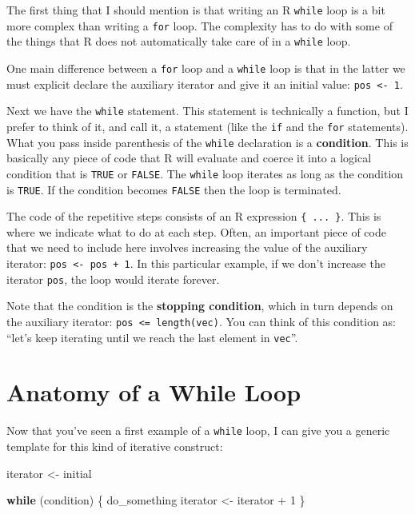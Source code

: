 \documentclass[
]{book}
\newenvironment{Shaded}{\begin{snugshade}}{\end{snugshade}}
\newcommand{\ControlFlowTok}[1]{\textcolor[rgb]{0.13,0.29,0.53}{\textbf{#1}}}
\newcommand{\DecValTok}[1]{\textcolor[rgb]{0.00,0.00,0.81}{#1}}
\newcommand{\NormalTok}[1]{#1}
\newcommand{\OtherTok}[1]{\textcolor[rgb]{0.56,0.35,0.01}{#1}}
\newcommand{\SpecialCharTok}[1]{\textcolor[rgb]{0.00,0.00,0.00}{#1}}
\begin{document}
The first thing that I should mention is that writing an R \texttt{while} loop is a
bit more complex than writing a \texttt{for} loop. The complexity has to do with some
of the things that R does not automatically take care of in a \texttt{while} loop.

One main difference between a \texttt{for} loop and a \texttt{while} loop is that in the
latter we must explicit declare the auxiliary iterator and give it an initial
value: \texttt{pos\ \textless{}-\ 1}.

Next we have the \texttt{while} statement. This statement is technically a function,
but I prefer to think of it, and call it, a statement (like the \texttt{if} and the
\texttt{for} statements). What you pass inside parenthesis of the \texttt{while} declaration
is a \textbf{condition}. This is basically any piece of code that R will evaluate
and coerce it into a logical condition that is \texttt{TRUE} or \texttt{FALSE}. The \texttt{while}
loop iterates as long as the condition is \texttt{TRUE}. If the condition becomes
\texttt{FALSE} then the loop is terminated.

The code of the repetitive steps consists of an R expression \texttt{\{\ ...\ \}}. This
is where we indicate what to do at each step. Often, an important piece of
code that we need to include here involves increasing the value of
the auxiliary iterator: \texttt{pos\ \textless{}-\ pos\ +\ 1}. In this particular example, if we
don't increase the iterator \texttt{pos}, the loop would iterate forever.

Note that the condition is the \textbf{stopping condition}, which in turn depends
on the auxiliary iterator: \texttt{pos\ \textless{}=\ length(vec)}. You can think of this
condition as: ``let's keep iterating until we reach the last element in \texttt{vec}''.

\hypertarget{anatomy-of-a-while-loop}{%
\section{Anatomy of a While Loop}\label{anatomy-of-a-while-loop}}

Now that you've seen a first example of a \texttt{while} loop, I can give you a
generic template for this kind of iterative construct:

\begin{Shaded}
\begin{Highlighting}[]
\NormalTok{iterator }\OtherTok{\textless{}{-}}\NormalTok{ initial}

\ControlFlowTok{while}\NormalTok{ (condition) \{}
\NormalTok{  do\_something}
\NormalTok{  iterator }\OtherTok{\textless{}{-}}\NormalTok{ iterator }\SpecialCharTok{+} \DecValTok{1}
\NormalTok{\}}
\end{Highlighting}
\end{Shaded}
\end{document}
